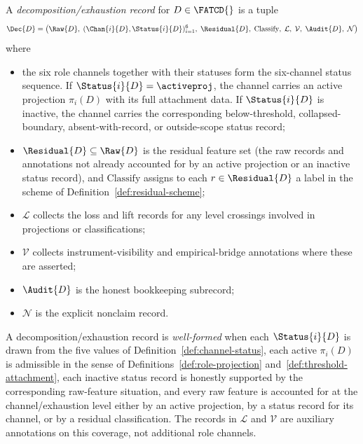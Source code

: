\begin{definition}\label{def:decomposition-record}
A \emph{decomposition/exhaustion record} for \(D \in \FATCD{}\) is a tuple
\[
\Dec{D} = \bigl(\Raw{D},\; (\Chan{i}{D}, \Status{i}{D})_{i=1}^{6},\;
\Residual{D},\; \mathrm{Classify},\; \mathcal{L},\; \mathcal{V},\;
\Audit{D},\; \mathcal{N}\bigr)
\]
where
\begin{itemize}[topsep=2pt,itemsep=1pt]
  \item the six role channels together with their statuses form the
    six-channel status sequence. If \(\Status{i}{D} = \activeproj\), the channel
    carries an active projection \(\pi_i(D)\) with its full attachment
    data. If \(\Status{i}{D}\) is inactive, the channel carries the
    corresponding below-threshold, collapsed-boundary,
    absent-with-record, or outside-scope status record;
  \item \(\Residual{D} \subseteq \Raw{D}\) is the residual feature set
    (the raw records and annotations not already accounted for by an
    active projection or an inactive status record), and
    \(\mathrm{Classify}\) assigns to each \(r \in \Residual{D}\) a label
    in the scheme of Definition~\ref{def:residual-scheme};
  \item \(\mathcal{L}\) collects the loss and lift records for any level
    crossings involved in projections or classifications;
  \item \(\mathcal{V}\) collects instrument-visibility and
    empirical-bridge annotations where these are asserted;
  \item \(\Audit{D}\) is the honest bookkeeping subrecord;
  \item \(\mathcal{N}\) is the explicit nonclaim record.
\end{itemize}
A decomposition/exhaustion record is \emph{well-formed} when each
\(\Status{i}{D}\) is drawn from the five values of
Definition~\ref{def:channel-status}, each active
\(\pi_i(D)\) is admissible in the sense of
Definitions~\ref{def:role-projection} and~\ref{def:threshold-attachment},
each inactive status record is honestly supported by the corresponding
raw-feature situation, and every raw feature is accounted for at the
channel/exhaustion level either by an active projection, by a status
record for its channel, or by a residual classification. The records in
\(\mathcal{L}\) and \(\mathcal{V}\) are auxiliary annotations on this
coverage, not additional role channels.
\end{definition}


